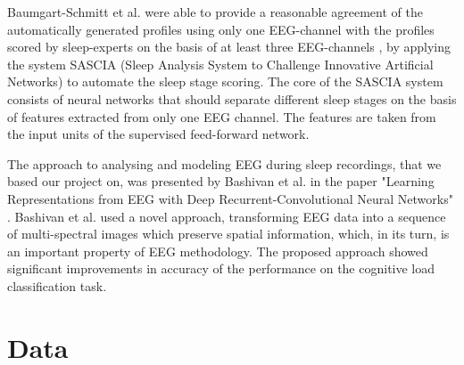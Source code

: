 \documentclass{article}
\begin{document}
Baumgart-Schmitt et al. were able to provide a reasonable agreement of the automatically generated profiles using only one EEG-channel with the profiles scored by sleep-experts on the basis of at least three EEG-channels \cite{somnology}, by applying the system SASCIA (Sleep Analysis System to Challenge Innovative Artificial Networks) to automate the sleep stage scoring. The core of the SASCIA system consists of neural networks that should separate different sleep stages on the basis of features extracted from only one EEG channel. The features are taken from the input units of the supervised feed-forward network.

The approach to analysing and modeling EEG during sleep recordings, that we based our project on, was presented by Bashivan et al. in the paper "Learning Representations from EEG with Deep Recurrent-Convolutional Neural Networks" \cite{learning_eeg_repr}. Bashivan et al. used a novel approach, transforming EEG data into a sequence of multi-spectral images which preserve spatial information, which, in its turn, is an important property of EEG methodology. The proposed approach showed significant improvements in accuracy of the performance on the cognitive load classification task.

\section{Data}
\end{document}
